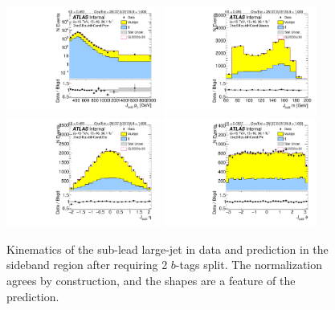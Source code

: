 \begin{figure}[htbp!]
\begin{center}
\includegraphics[width=0.45\textwidth,angle=-90]{figures/boosted/Sideband/b77_TwoTag_split_Sideband_sublHCand_Pt_m_1.pdf}
\includegraphics[width=0.45\textwidth,angle=-90]{figures/boosted/Sideband/b77_TwoTag_split_Sideband_sublHCand_Mass_s.pdf}\\
\includegraphics[width=0.45\textwidth,angle=-90]{figures/boosted/Sideband/b77_TwoTag_split_Sideband_sublHCand_Eta.pdf}
\includegraphics[width=0.45\textwidth,angle=-90]{figures/boosted/Sideband/b77_TwoTag_split_Sideband_sublHCand_Phi.pdf}
  \caption{Kinematics of the sub-lead large-\R jet in data and prediction in the sideband region after requiring 2 $b$-tags split. The normalization agrees by construction, and the shapes are a feature of the prediction.}
  \label{fig:boosted-2bs-sideband-ak10-subl}
\end{center}
\end{figure}

